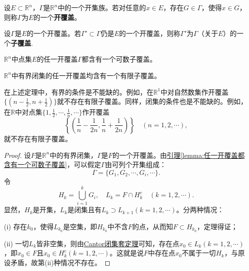 \documentclass[lang=cn,newtx,10pt,scheme=chinese]{../Template/elegantbook}
\begin{document}
\begin{definition}[开覆盖]\label{definition:开覆盖}
设\(E\subset\mathbb{R}^n\)，\(\Gamma\)是\(\mathbb{R}^n\)中的一个开集族。若对任意的\(x\in E\)，存在\(G\in\Gamma\)，使得\(x\in G\)，则称\(\Gamma\)为\(E\)的一个\textbf{开覆盖}。

设\(\Gamma\)是\(E\)的一个开覆盖。若\(\Gamma'\subset\Gamma\)仍是\(E\)的一个开覆盖，则称\(\Gamma'\)为\(\Gamma\)（关于\(E\)）的一个\textbf{子覆盖}.
\end{definition}

\begin{lemma}\label{lemma:任一开覆盖都含有一个可数子覆盖}
  \(\mathbb{R}^n\)中点集\(E\)的任一开覆盖\(\Gamma\)都含有一个可数子覆盖。
\end{lemma}

\begin{theorem}\label{theorem:Heine - Borel有限子覆盖定理}
\(\mathbb{R}^n\)中有界闭集的任一开覆盖均含有一个有限子覆盖。
\end{theorem}
\begin{remark}
  在上述定理中，有界的条件是不能缺的。例如，在\(\mathbb{R}^1\)中对自然数集作开覆盖\(\{(n-\frac{1}{2},n+\frac{1}{2})\}\)就不存在有限子覆盖。同样，闭集的条件也是不能缺的。例如，在\(\mathbb{R}\)中对点集\(\{1,\frac{1}{2},\cdots,\frac{1}{n},\cdots\}\)作开覆盖
\[\left\{\left(\frac{1}{n}-\frac{1}{2n},\frac{1}{n}+\frac{1}{2n}\right)\right\}\quad(n = 1,2,\cdots),\]
就不存在有限子覆盖。
\end{remark}
\begin{proof}
  设\(F\)是\(\mathbb{R}^n\)中的有界闭集，\(\Gamma\)是\(F\)的一个开覆盖。由\hyperref[lemma:任一开覆盖都含有一个可数子覆盖]{引理\ref{lemma:任一开覆盖都含有一个可数子覆盖}}，可以假定\(\Gamma\)由可列个开集组成：
\[\Gamma=\{G_1,G_2,\cdots,G_i,\cdots\}.\]
令
\[H_k=\bigcup_{i = 1}^{k}G_i,\quad L_k = F\cap H_k^c\quad(k = 1,2,\cdots).\]
显然，\(H_k\)是开集，\(L_k\)是闭集且有\(L_k\supset L_{k + 1}(k = 1,2,\cdots)\)。分两种情况：

(i) 存在\(k_0\)，使得\(L_{k_0}\)是空集，即\(H_{k_0}\)中不含\(F\)的点，从而知\(F\subset H_{k_0}\)，定理得证；

(ii) 一切\(L_k\)皆非空集，则由\hyperref[theorem:Cantor闭集套定理]{Cantor闭集套定理}可知，存在点\(x_0\in L_k(k = 1,2,\cdots)\)，即\(x_0\in F\)且\(x_0\in H_k^c(k = 1,2,\cdots)\)。这就是说\(F\)中存在点\(x_0\)不属于一切\(H_k\)，与原设矛盾，故第(ii)种情况不存在。
\end{proof}
\end{document}
